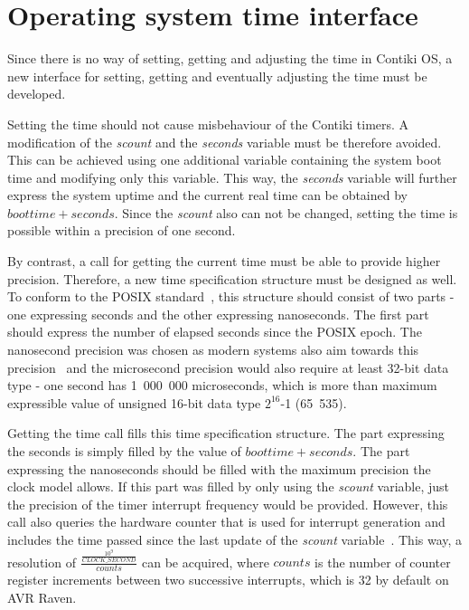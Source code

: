 
\section{Operating system time interface}
Since there is no way of setting, getting and adjusting the time in Contiki OS,
a new interface for setting, getting and eventually adjusting the time must be developed.

Setting the time should not cause misbehaviour of the Contiki timers.
A modification of the {\it{scount}} and the {\it{seconds}} variable must be therefore avoided.
This can be achieved using one additional variable containing the system boot time
and modifying only this variable.
This way, the {\it{seconds}} variable will further express the system uptime
and the current real time can be obtained by $boottime + seconds$.
Since the {\it{scount}} also can not be changed, setting the time is possible
within a precision of one second.

By contrast, a call for getting the current time must be able to provide higher precision.
Therefore, a new time specification structure must be designed as well.
To conform to the POSIX standard~\cite{posix}, this structure should consist of two parts -
one expressing seconds and the other expressing nanoseconds.
The first part should express the number of elapsed seconds since the POSIX epoch.
The nanosecond precision was chosen as modern systems also aim towards this
precision~\cite{posix,ntp-precision} and
the microsecond precision would also require at least 32-bit data type -
one second has 1~000~000 microseconds, which is more than maximum expressible value of unsigned 16-bit
data type $2^{16}$-1 (65~535).

Getting the time call fills this time specification structure.
The part expressing the seconds is simply filled by the value of $boottime + seconds$.
The part expressing the nanoseconds should be filled with the maximum precision
the clock model allows.
If this part was filled by only using the {\it{scount}} variable,
just the precision of the timer interrupt frequency would be provided.
However, this call also queries the hardware counter that is used for
interrupt generation and includes the time passed since
the last update of the {\it{scount}} variable~\cite{thesis-beat}.
This way, a resolution of $\frac{\frac{10^9}{CLOCK\_SECOND}}{counts}$ can be acquired,
where $counts$ is the number of counter register increments between two successive interrupts,
which is 32 by default on AVR Raven.

